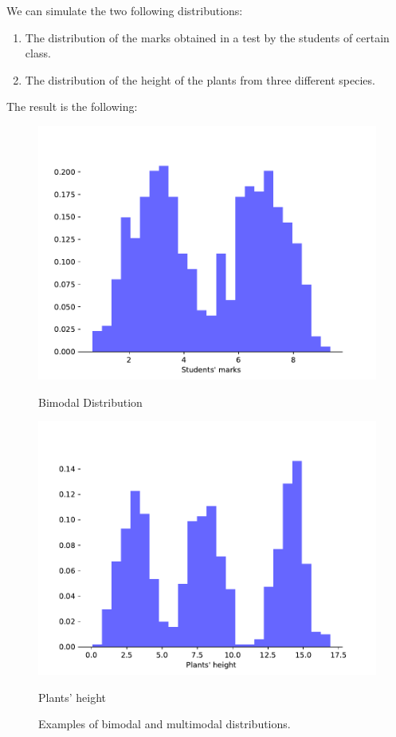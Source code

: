 \begin{nexample}
We can simulate the two following distributions:
\begin{enumerate}
    \item The distribution of the marks obtained in a test by the students of certain class.
    \item The distribution of the height of the plants from three different species.
\end{enumerate}
The result is the following:
\begin{figure}[H]%
      \includegraphics[width=\linewidth]{media/bimodal.pdf}
      \caption{Bimodal Distribution}\label{fig:linCM}
    \endminipage\hfill
      \includegraphics[width=\linewidth]{media/multimodal.pdf}
      \caption{Plants' height}\label{fig:RFCM}
    \endminipage
    \caption{Examples of bimodal and multimodal distributions.}
    \end{figure}
\end{nexample}


